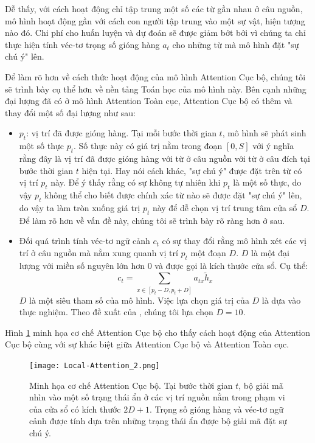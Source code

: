 Dễ thấy, với cách hoạt động chỉ tập trung một số các từ gần nhau ở câu nguồn, mô hình hoạt động gần với cách con người tập trung vào một sự vật, hiện tượng nào đó. Chi phí cho huấn luyện và dự đoán sẽ được giảm bớt bởi vì chúng ta chỉ thực hiện tính véc-tơ trọng số gióng hàng $a_t$ cho những từ mà mô hình đặt "sự chú ý" lên.

Để làm rõ hơn về cách thức hoạt động của mô hình Attention Cục bộ, chúng tôi sẽ trình bày cụ thể hơn về nền tảng Toán học của mô hình này. Bên cạnh những đại lượng đã có ở mô hình Attention Toàn cục, Attention Cục bộ có thêm và thay đổi một số đại lượng như sau:
\begin{itemize}
	\item $p_t$: vị trí đã được gióng hàng. Tại mỗi bước thời gian $t$, mô hình sẽ phát sinh một số thực $p_t$. Số thực này có giá trị nằm trong đoạn $[0, S]$ với ý nghĩa rằng đây là vị trí đã được gióng hàng với từ ở câu nguồn với từ ở câu đích tại bước thời gian $t$ hiện tại. Hay nói cách khác, "sự chú ý" được đặt trên từ có vị trí $p_t$ này. Để ý thấy rằng có sự không tự nhiên khi $p_t$ là một số thực, do vậy $p_t$ không thể cho biết được chính xác từ nào sẽ được đặt "sự chú ý" lên, do vậy ta làm tròn xuống giá trị $p_t$ này để dễ chọn vị trí trung tâm cửa sổ $D$. Để làm rõ hơn về vấn đề này, chúng tôi sẽ trình bày rõ ràng hơn ở sau.
	\item Đối quá trình tính véc-tơ ngữ cảnh $c_t$ có sự thay đổi rằng mô hình xét các vị trí ở câu nguồn mà nằm xung quanh vị trí $p_t$ một đoạn $D$. $D$ là một đại lượng với miền số nguyên lớn hơn 0 và được gọi là kích thước cửa sổ. Cụ thể:
	\begin{equation}
	c_t = \sum_{x \in [p_t - D, p_t + D]} a_{tx}\tilde{h}_x
	\end{equation}
	$D$ là một siêu tham số của mô hình. Việc lựa chọn giá trị của $D$ là dựa vào thực nghiệm. Theo đề xuất của \cite{attentionThangLuong2015}, chúng tôi lựa chọn $D = 10$.
\end{itemize}

Hình \ref{fig_Local_Attention} minh họa cơ chế Attention Cục bộ cho thấy cách hoạt động của Attention Cục bộ cùng với sự khác biệt giữa Attention Cục bộ và Attention Toàn cục.

\begin{figure}
	\centering
	\texttt{[image: Local-Attention\_2.png]}
	\caption[Minh họa cơ chế Attention Cục bộ.]{Minh họa cơ chế Attention Cục bộ. Tại bước thời gian $t$, bộ giải mã nhìn vào một số trạng thái ẩn ở các vị trí nguồn nằm trong phạm vi của cửa sổ có kích thước $2D + 1$. Trọng số gióng hàng và véc-tơ ngữ cảnh được tính dựa trên những trạng thái ẩn được bộ giải mã đặt sự chú ý.}
	\label{fig_Local_Attention}
\end{figure}


